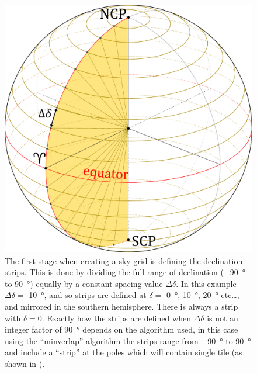 \begin{colsection}
\begin{colsection}
\begin{figure}[p]
\begin{center}
\includegraphics[width=\linewidth]{images/globe2.pdf}
\end{center}
\caption[Defining declination strips]{The first stage when creating a sky grid is defining the declination strips. This is done by dividing the full range of declination (\SI{-90}{\degree} to \SI{90}{\degree}) equally by a constant spacing value $\Delta\delta$. In this example $\Delta\delta =$ \SI{10}{\degree}, and so strips are defined at $\delta=$ \SI{0}{\degree}, \SI{10}{\degree}, \SI{20}{\degree} etc\ldots, and mirrored in the southern hemisphere. There is always a strip with $\delta=0$. Exactly how the strips are defined when $\Delta\delta$ is not an integer factor of \SI{90}{\degree} depends on the algorithm used, in this case using the ``minverlap'' algorithm the strips range from \SI{-90}{\degree} to \SI{90}{\degree} and include a ``strip'' at the poles which will contain single tile (as shown in ).
}
\label{fig:deltadelta}
\end{figure}


\end{colsection}
\end{colsection}
